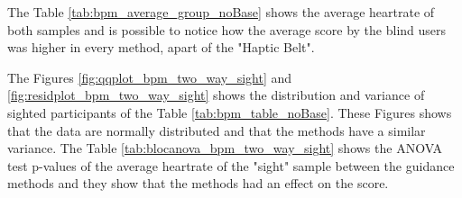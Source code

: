 The Table \ref{tab:bpm_average_group_noBase} shows the average heartrate of both samples and is possible to notice how the average score by the blind users was higher in every method, apart of the "Haptic Belt".



The Figures \ref{fig:qqplot_bpm_two_way_sight} and \ref{fig:residplot_bpm_two_way_sight} shows the distribution and variance of sighted participants of the Table \ref{tab:bpm_table_noBase}. These Figures shows that the data are normally distributed and that the methods have a similar variance.
The Table \ref{tab:blocanova_bpm_two_way_sight} shows the ANOVA test p-values of the average heartrate of the "sight" sample between the guidance methods and they show that the methods had an effect on the score.



